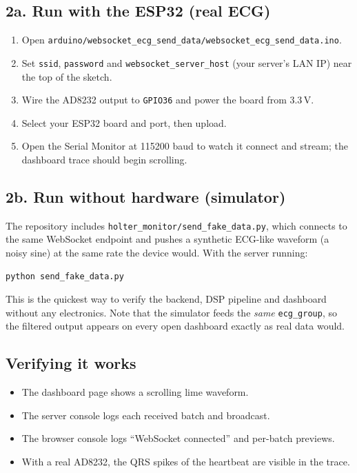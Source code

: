 \subsection{2a. Run with the ESP32 (real ECG)}
\begin{enumerate}[noitemsep]
  \item Open \texttt{arduino/websocket\_ecg\_send\_data/websocket\_ecg\_send\_data.ino}.
  \item Set \texttt{ssid}, \texttt{password} and \texttt{websocket\_server\_host}
        (your server's LAN IP) near the top of the sketch.
  \item Wire the AD8232 output to \texttt{GPIO36} and power the board from 3.3\,V.
  \item Select your ESP32 board and port, then upload.
  \item Open the Serial Monitor at 115200 baud to watch it connect and stream;
        the dashboard trace should begin scrolling.
\end{enumerate}

\subsection{2b. Run without hardware (simulator)}
The repository includes \texttt{holter\_monitor/send\_fake\_data.py}, which connects
to the same WebSocket endpoint and pushes a synthetic ECG-like waveform (a noisy
sine) at the same rate the device would. With the server running:
\begin{lstlisting}[style=base,numbers=none]
python send_fake_data.py
\end{lstlisting}
This is the quickest way to verify the backend, DSP pipeline and dashboard without
any electronics. Note that the simulator feeds the \emph{same} \texttt{ecg\_group},
so the filtered output appears on every open dashboard exactly as real data would.

\subsection{Verifying it works}
\begin{itemize}[noitemsep]
  \item The dashboard page shows a scrolling lime waveform.
  \item The server console logs each received batch and broadcast.
  \item The browser console logs ``WebSocket connected'' and per-batch previews.
  \item With a real AD8232, the QRS spikes of the heartbeat are visible in the
        trace.
\end{itemize}

